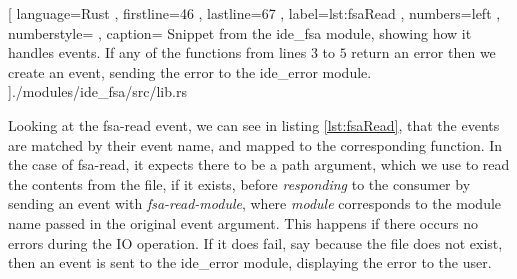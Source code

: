 \begin{code}[H]
  
    [ language=Rust
    , firstline=46
    , lastline=67
    , label=lst:fsaRead
    , numbers=left
    , numberstyle=\tiny\color{gray}
    , caption={
      Snippet from the ide\_fsa module, showing how it handles events. If any of
      the functions from lines $3$ to $5$ return an error then we create an event,
      sending the error to the ide\_error module.
    }
    ]{./modules/ide\_fsa/src/lib.rs}
\end{code}

Looking at the fsa-read event, we can see in listing \ref{lst:fsaRead}, that the
events are matched by their event name, and mapped to the corresponding function.
In the case of fsa-read, it expects there to be a path argument, which we use to
read the contents from the file, if it exists, before \textit{responding} to the
consumer by sending an event with \textit{fsa-read-module}, where
\textit{module} corresponds to the module name passed in the original event
argument. This happens if there occurs no errors\footnotemark{} during the IO
operation. If it does fail, say because the file does not exist, then an event
is sent to the ide\_error module, displaying the error to the user.

